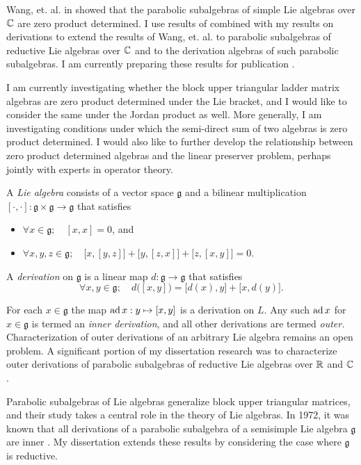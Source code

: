 \documentclass[11pt]{article}
\begin{document}
Wang, et. al. in \cite{wang2011class} showed that the parabolic
subalgebras of simple Lie algebras over $\mathbb{C}$ are zero product
determined. I use results of  \cite{article:brice2015zero} combined with
my results on derivations \cite{arxiv:brice2015derivations} to extend
the results of Wang, et. al. to parabolic subalgebras of reductive Lie
algebras over $\mathbb{C}$ and to the derivation algebras of such parabolic
subalgebras. I am currently preparing these results for publication
\cite{inprep:brice0000note}.

I am currently investigating whether the block upper triangular ladder
matrix algebras are zero product determined under the Lie bracket, and I
would like to consider the same under the Jordan product as well. More
generally, I am investigating conditions under which the semi-direct sum
of two algebras is zero product determined. I would also like to further
develop the relationship between zero product determined algebras and
the linear preserver problem, perhaps jointly with experts in operator
theory.


A \emph{Lie algebra} consists of a vector space $\mathfrak{g}$
and a bilinear multiplication
$[\cdot,\cdot]: \mathfrak{g} \times \mathfrak{g} \to \mathfrak{g}$
that satisfies
\begin{itemize}
	\item[] $\forall x \in \mathfrak{g};\quad [x,x] = 0$, and
	\item[] $\forall x,y,z \in \mathfrak{g};\quad
    \big[x,[y,z]\big]+\big[y,[z,x]\big]+\big[z,[x,y]\big]=0$.
\end{itemize}
A \emph{derivation} on $\mathfrak{g}$ is a linear map
$d: \mathfrak{g} \to \mathfrak{g}$ that satisfies
\[
  \forall x,y \in \mathfrak{g};\quad
  d\big([x,y]\big) = \big[d(x),y\big] + \big[x,d(y)\big]
  \text{.}
\]

For each $x \in \mathfrak{g}$ the map $\operatorname{ad} x : y \mapsto [x,y]$ is a
derivation on $L$. Any such $\operatorname{ad} x$ for $x \in \mathfrak{g}$ is termed
an \emph{inner derivation}, and all other derivations are termed
\emph{outer.} Characterization of outer derivations of an arbitrary Lie
algebra remains an open problem. A significant portion of my
dissertation research was to characterize outer derivations of parabolic
subalgebras of reductive Lie algebras over $\mathbb{R}$ and $\mathbb{C}$.

Parabolic subalgebras of Lie algebras generalize block upper triangular
matrices, and their study takes a central role in the theory of Lie
algebras. In 1972, it was known that all derivations of a parabolic
subalgebra of a semisimple Lie algebra $\mathfrak{g}$ are inner
\cite{leger1972cohomology}. My dissertation extends these results by
considering the case where $\mathfrak{g}$ is reductive.
\end{document}
